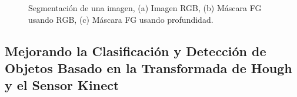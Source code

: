         \begin{figure}[!htb]
        	\centering
        	\caption[Segmentación de una imagen.]{Segmentación de una imagen, (a) Imagen RGB, (b) Máscara FG usando RGB, (c) Máscara FG usando profundidad.
        		\label{fig:02Antecedentes}}
        \end{figure}
    
    
    \subsection{Mejorando la Clasificación y Detección de Objetos Basado en la Transformada de Hough y el Sensor Kinect}
    
